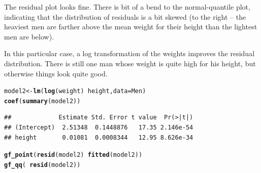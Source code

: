 \documentclass[twoside]{book}\usepackage[]{graphicx}\usepackage[]{xcolor}
\makeatletter
\newcommand{\hlopt}[1]{\textcolor[rgb]{0,0,0}{#1}}%
\newcommand{\hlstd}[1]{\textcolor[rgb]{0.345,0.345,0.345}{#1}}%
\newcommand{\hlkwb}[1]{\textcolor[rgb]{0.69,0.353,0.396}{#1}}%
\newcommand{\hlkwc}[1]{\textcolor[rgb]{0.333,0.667,0.333}{#1}}%
\newcommand{\hlkwd}[1]{\textcolor[rgb]{0.737,0.353,0.396}{\textbf{#1}}}%
\newenvironment{kframe}{%
 \def\at@end@of@kframe{}%
 \ifinner\ifhmode%
  \def\at@end@of@kframe{\end{minipage}}%
  \begin{minipage}{\columnwidth}%
 \fi\fi%
 \def\FrameCommand##1{\hskip\@totalleftmargin \hskip-\fboxsep
 \colorbox{shadecolor}{##1}\hskip-\fboxsep
     \hskip-\linewidth \hskip-\@totalleftmargin \hskip\columnwidth}%
 \MakeFramed {\advance\hsize-\width
   \@totalleftmargin\z@ \linewidth\hsize
   \@setminipage}}%
 {\par\unskip\endMakeFramed%
 \at@end@of@kframe}
\newenvironment{knitrout}{}{} %
\makeatother
\begin{document}
\begin{solution}
\begin{enumerate}
\begin{knitrout}
{}



\end{knitrout}
The residual plot looks fine.  There is bit of a bend to the normal-quantile plot, indicating
that the distribution of residuals is a bit skewed (to the right -- the heaviest men are farther above
the mean weight for their height than the lightest men are below).

In this particular case, a log transformation of the weights improves the
residual distribution.  There is still one man whose weight is quite high for
his height, but otherwise things look quite good.
\begin{knitrout}
\color{fgcolor}\begin{kframe}
\begin{alltt}
\hlstd{model2} \hlkwb{<-} \hlkwd{lm}\hlstd{(} \hlkwd{log}\hlstd{(weight)} \hlopt{~} \hlstd{height,} \hlkwc{data} \hlstd{= Men)}
\hlkwd{coef}\hlstd{(}\hlkwd{summary}\hlstd{(model2))}
\end{alltt}
\begin{verbatim}
##             Estimate Std. Error t value  Pr(>|t|)
## (Intercept)  2.51348  0.1448876   17.35 2.146e-54
## height       0.01081  0.0008344   12.95 8.626e-34
\end{verbatim}
\begin{alltt}
\hlkwd{gf_point}\hlstd{(}\hlkwd{resid}\hlstd{(model2)} \hlopt{~} \hlkwd{fitted}\hlstd{(model2))}
\hlkwd{gf_qq}\hlstd{(} \hlopt{~} \hlkwd{resid}\hlstd{(model2))}
\end{alltt}
\end{kframe}


\end{knitrout}
\end{enumerate}
\end{solution}
\end{document}
